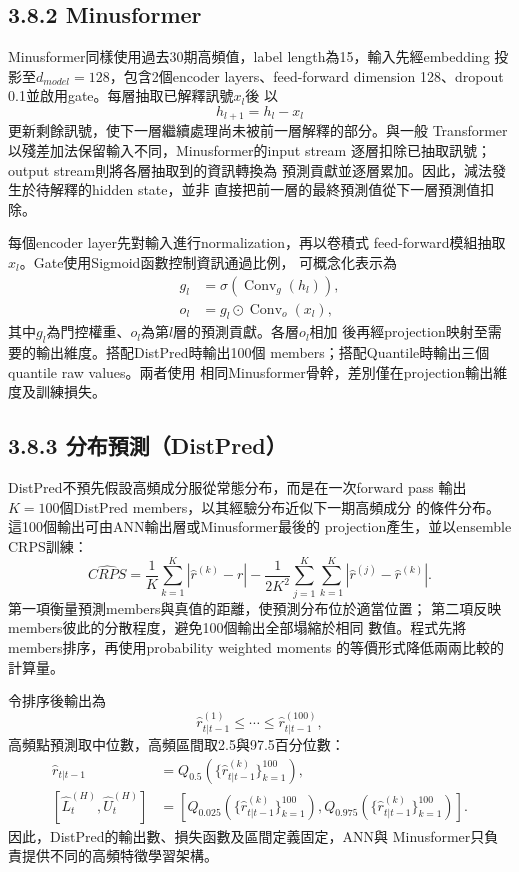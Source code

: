 \subsection*{3.8.2 Minusformer}

Minusformer同樣使用過去30期高頻值，label length為15，輸入先經embedding
投影至$d_{model}=128$，包含2個encoder layers、feed-forward
dimension 128、dropout 0.1並啟用gate。每層抽取已解釋訊號$x_l$後
以
\begin{equation}
 h_{l+1}=h_l-x_l
\end{equation}
更新剩餘訊號，使下一層繼續處理尚未被前一層解釋的部分。與一般
Transformer以殘差加法保留輸入不同，Minusformer的input stream
逐層扣除已抽取訊號；output stream則將各層抽取到的資訊轉換為
預測貢獻並逐層累加。因此，減法發生於待解釋的hidden state，並非
直接把前一層的最終預測值從下一層預測值扣除。

每個encoder layer先對輸入進行normalization，再以卷積式
feed-forward模組抽取$x_l$。Gate使用Sigmoid函數控制資訊通過比例，
可概念化表示為
\begin{align}
 g_l&=\sigma\!\left(\operatorname{Conv}_g(h_l)\right),\\
 o_l&=g_l\odot\operatorname{Conv}_o(x_l),
\end{align}
其中$g_l$為門控權重、$o_l$為第$l$層的預測貢獻。各層$o_l$相加
後再經projection映射至需要的輸出維度。搭配DistPred時輸出100個
members；搭配Quantile時輸出三個quantile raw values。兩者使用
相同Minusformer骨幹，差別僅在projection輸出維度及訓練損失。

\subsection*{3.8.3 分布預測（DistPred）}

DistPred不預先假設高頻成分服從常態分布，而是在一次forward pass
輸出$K=100$個DistPred members，以其經驗分布近似下一期高頻成分
的條件分布。這100個輸出可由ANN輸出層或Minusformer最後的
projection產生，並以ensemble CRPS訓練：
\begin{equation}
 \widehat{CRPS}
 =\frac{1}{K}\sum_{k=1}^{K}
  \left|\widehat r^{(k)}-r\right|
 -\frac{1}{2K^2}\sum_{j=1}^{K}\sum_{k=1}^{K}
  \left|\widehat r^{(j)}-\widehat r^{(k)}\right|.
\end{equation}
第一項衡量預測members與真值的距離，使預測分布位於適當位置；
第二項反映members彼此的分散程度，避免100個輸出全部塌縮於相同
數值。程式先將members排序，再使用probability weighted moments
的等價形式降低兩兩比較的計算量。

令排序後輸出為
\begin{equation}
 \widehat r_{t|t-1}^{(1)}\leq\cdots\leq
 \widehat r_{t|t-1}^{(100)},
\end{equation}
高頻點預測取中位數，高頻區間取2.5與97.5百分位數：
\begin{align}
 \widehat r_{t|t-1}&=Q_{0.5}
 \left(\{\widehat r_{t|t-1}^{(k)}\}_{k=1}^{100}\right),\\
 [\widehat L_t^{(H)},\widehat U_t^{(H)}]
 &=\left[Q_{0.025}
 \left(\{\widehat r_{t|t-1}^{(k)}\}_{k=1}^{100}\right),
 Q_{0.975}
 \left(\{\widehat r_{t|t-1}^{(k)}\}_{k=1}^{100}\right)\right].
\end{align}
因此，DistPred的輸出數、損失函數及區間定義固定，ANN與
Minusformer只負責提供不同的高頻特徵學習架構。


